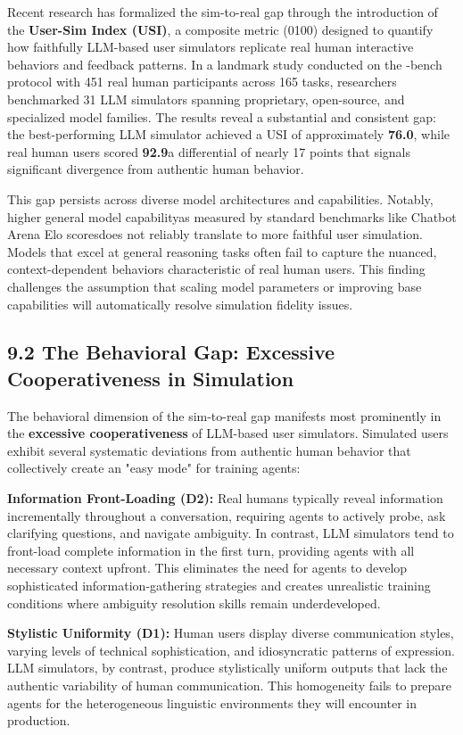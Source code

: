 Recent research has formalized the sim-to-real gap through the introduction of the \textbf{User-Sim Index (USI)}, a composite metric (0100) designed to quantify how faithfully LLM-based user simulators replicate real human interactive behaviors and feedback patterns. In a landmark study conducted on the -bench protocol with 451 real human participants across 165 tasks, researchers benchmarked 31 LLM simulators spanning proprietary, open-source, and specialized model families. The results reveal a substantial and consistent gap: the best-performing LLM simulator achieved a USI of approximately \textbf{76.0}, while real human users scored \textbf{92.9}a differential of nearly 17 points that signals significant divergence from authentic human behavior.

This gap persists across diverse model architectures and capabilities. Notably, higher general model capabilityas measured by standard benchmarks like Chatbot Arena Elo scoresdoes not reliably translate to more faithful user simulation. Models that excel at general reasoning tasks often fail to capture the nuanced, context-dependent behaviors characteristic of real human users. This finding challenges the assumption that scaling model parameters or improving base capabilities will automatically resolve simulation fidelity issues.

\subsection{9.2 The Behavioral Gap: Excessive Cooperativeness in Simulation}

The behavioral dimension of the sim-to-real gap manifests most prominently in the \textbf{excessive cooperativeness} of LLM-based user simulators. Simulated users exhibit several systematic deviations from authentic human behavior that collectively create an "easy mode" for training agents:

\textbf{Information Front-Loading (D2):} Real humans typically reveal information incrementally throughout a conversation, requiring agents to actively probe, ask clarifying questions, and navigate ambiguity. In contrast, LLM simulators tend to front-load complete information in the first turn, providing agents with all necessary context upfront. This eliminates the need for agents to develop sophisticated information-gathering strategies and creates unrealistic training conditions where ambiguity resolution skills remain underdeveloped.

\textbf{Stylistic Uniformity (D1):} Human users display diverse communication styles, varying levels of technical sophistication, and idiosyncratic patterns of expression. LLM simulators, by contrast, produce stylistically uniform outputs that lack the authentic variability of human communication. This homogeneity fails to prepare agents for the heterogeneous linguistic environments they will encounter in production.


